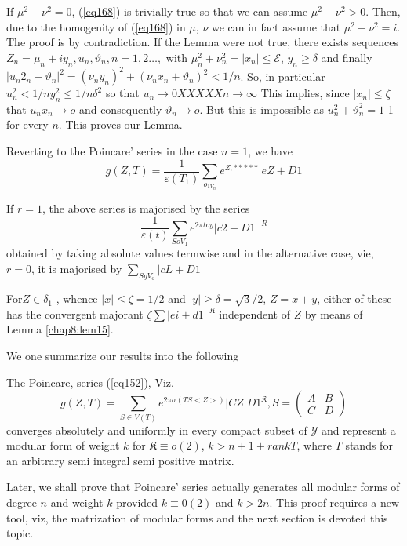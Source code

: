 If $\mu^2 + \nu^2 = 0$, (\ref{eq168}) is trivially true so that we can
assume $\mu^2 + \nu^2>0$. Then, due to the homogenity of (\ref{eq168}) in
$\mu$, $\nu$ we can in fact assume that $\mu^2 + \nu^2 = i$.  
The proof is by contradiction. If the Lemma were not true, there
exists sequences $Z_n= \mu _n + i y_n, u_n, \vartheta_n, n=1,2
\ldots,$ with $\mu^2_n+ \nu^2_n=|x_n| \leq \mathscr{E}$, $y_n \ge
\delta$ and finally  $|u_n 2_n  +  \vartheta_n|^2 = ( \nu _n y_n)^2
+(\nu_n x_n + \vartheta_n)^2 < 1/n$. So, in particular $u_n^2 < 1/n
y^2_n \le 1/n \delta^2$ so that $u_n \rightarrow 0 XXXXX n \to \infty
$ This implies, since $|x_n| \le \zeta$ that $u_n  x_n \to o$ and
consequently $\vartheta_n \to  o$. But  this is impossible as $u_n^2
+ \vartheta^2_n =1$ 1 for every $n$. This  proves our Lemma.    

Reverting to the Poincare'  series in the case $n=1$, we have
$$
g(Z,T)= \frac{1}{\varepsilon(T_1)} \sum\limits_{o_{1 V_n}} e^{Z ,
  *****} | e Z + D1 
$$

If  $r=1$, the above series is majorised by the series  
$$
\frac{1}{\varepsilon(t)} \sum\limits_{S o V_1} e ^{2 \pi t o y } |c2-
D1^{-R} 
$$
obtained by taking absolute values termwise and in the alternative
case, vie, $r=0$, it is majorised by $ \sum\limits_{S g V_o} |c L +D1$  

For\pageoriginale  $Z \in \delta_1$ , whence $|x| \le  \zeta = 1/2$
and $|y| \ge 
\delta = \sqrt{3}/2$, $Z= x+y$, either of these has the convergent
majorant $\zeta \sum |ei  + d 1^{-\mathfrak{K}}$ independent of $Z$ by
means of Lemma \ref{chap8:lem15}. 

We one summarize our results into the following


\begin{thm}%
 The Poincare, series (\ref{eq152}), Viz. 
$$
g (Z,T) = \sum\limits_{S \in V(T)} e^{2 \pi \sigma(T S < Z>)}
|CZ|D1^{\mathfrak{K}}, S= \begin{pmatrix} A&B \\ C &D \end{pmatrix}  
$$
converges absolutely and uniformly in every compact subset of $
  \mathscr{Y}$  and represent a modular form of weight  $k$ for
$\mathfrak{K} \equiv o(2)$,  $k > n +  1+ rank T$, where  $T$
  stands  for an arbitrary semi integral semi positive matrix.  
\end{thm}


Later,  we shall prove that Poincare' series actually generates all
modular forms of degree $n$  and weight $k$  provided $k \equiv 0(2)$
and $k > 2n$. This proof requires a new tool, viz, the matrization of
modular forms and the next section is devoted  this topic.  


